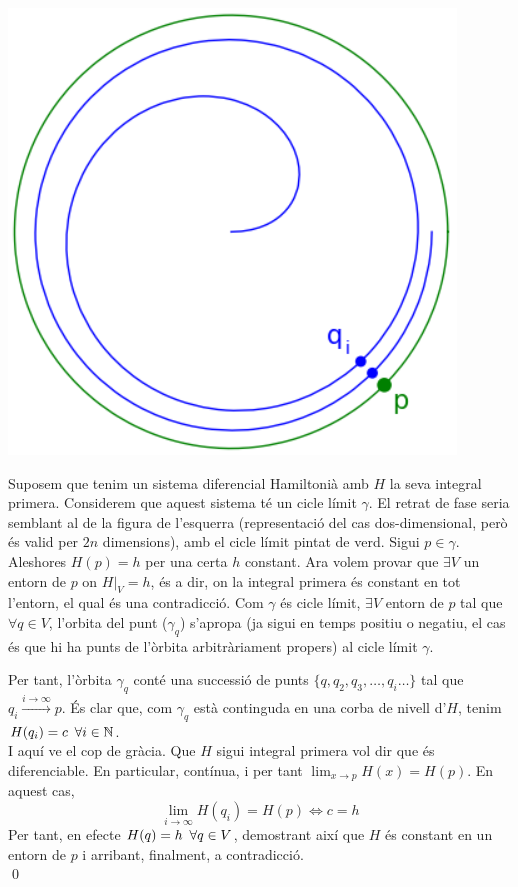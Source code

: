 \documentclass[10pt,a4paper]{article}
\begin{document}
\begin{minipage}[h]{7cm}
  \includegraphics[scale=0.7]{Images/ciclim}
  \label{ciclim}
\end{minipage}\vspace{3mm}
\begin{minipage}[h]{8.2cm}
  Suposem que tenim un sistema diferencial Hamiltonià amb $H$ la seva integral primera. Considerem que aquest sistema té un cicle límit $\gamma$. El retrat de fase seria semblant al de la figura de l'esquerra (representació del cas dos-dimensional, però és valid per $2n$ dimensions), amb el cicle límit pintat de verd. Sigui $p\in\gamma$. Aleshores $H(p)=h$ per una certa $h$ constant. Ara volem provar que $\exists V$ un entorn de $p$ on $H|_V=h$, és a dir, on la integral primera és constant en tot l'entorn, el qual és una contradicció. Com $\gamma$ és cicle límit, $\exists V$ entorn de $p$ tal que $\forall q\in V$, l'orbita del punt ($\gamma_q$) s'apropa (ja sigui en temps positiu o negatiu, el cas és que hi ha punts de l'òrbita arbitràriament propers) al cicle límit $\gamma$.
\end{minipage}

Per tant, l'òrbita $\gamma_q$ conté una successió de punts $\{q,q_2,q_3,\dots,q_i\dots\}$ tal que $q_i\xrightarrow[]{i\to\infty}p$. És clar que, com $\gamma_q$ està continguda en una corba de nivell d'$H$, tenim $H(q_i)=c\enskip\forall i\in\mathbb{N}$.
\\I aquí ve el cop de gràcia. Que $H$ sigui integral primera vol dir que és diferenciable. En particular, contínua, i per tant $\displaystyle \lim_{x\rightarrow p}H(x)=H(p)$. En aquest cas,
$$
  \lim_{i\to\infty}H(q_i)=H(p)\iff \boxed{c=h}
$$
Per tant, en efecte $H(q)=h\enskip \forall q\in V$, demostrant així que $H$ és constant en un entorn de $p$ i arribant, finalment, a contradicció.
\\\qed
\newpage
\end{document}

